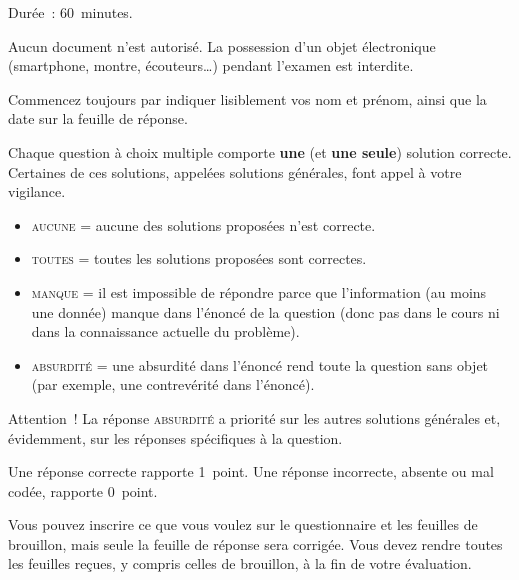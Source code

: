 \documentclass[11pt,french,a4paper,twoside]{article}
\newcommand{\thesubtitle}{Examen blanc du \thedate{}}
\begin{document}
\begin{examcopy}[2]
  \setcounter{figure}{0}
  \noindent{\bf \thetitle{} \hfill{} \thesubtitle{}}

  \vspace{2ex}

  Durée~: 60~minutes.

  Aucun document n'est autorisé.
  La possession d'un objet électronique (smartphone, montre, écouteurs\ldots{}) pendant l'examen est interdite.

  Commencez toujours par indiquer lisiblement vos nom et prénom, ainsi que la date sur la feuille de réponse.

  Chaque question à choix multiple comporte \textbf{une} (et \textbf{une seule}) solution correcte.
  Certaines de ces solutions, appelées solutions générales, font appel à votre vigilance.
  \begin{itemize}
    \item \textsc{aucune} = aucune des solutions proposées n'est correcte.
    \item \textsc{toutes} = toutes les solutions proposées sont correctes.
    \item \textsc{manque} = il est impossible de répondre parce que l'information (au moins une donnée) manque dans l'énoncé de la question (donc pas dans le cours ni dans la connaissance actuelle du problème).
    \item \textsc{absurdité} = une absurdité dans l'énoncé rend toute la question sans objet (par exemple, une contrevérité dans l'énoncé).
  \end{itemize}
  Attention~! La réponse \textsc{absurdité} a priorité sur les autres solutions générales et, évidemment, sur les réponses spécifiques à la question.

  Une réponse correcte rapporte 1~point.
  Une réponse incorrecte, absente ou mal codée, rapporte 0~point.

  Vous pouvez inscrire ce que vous voulez sur le questionnaire et les feuilles de brouillon, mais seule la feuille de réponse sera corrigée.
  Vous devez rendre toutes les feuilles reçues, y compris celles de brouillon, à la fin de votre évaluation.

  \noindent{\hrulefill{}}

  \vspace{2ex}





\end{examcopy}
\end{document}
